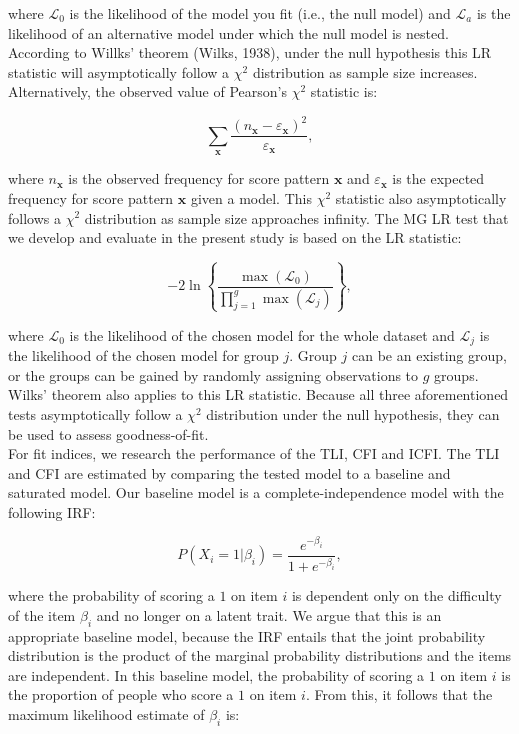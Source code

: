 \documentclass[Royal,sageapa,times,doublespace]{sagej}
\begin{document}
where $\mathcal{L}_0$ is the likelihood of the model you fit (i.e., the null model) and $\mathcal{L}_a$ is the likelihood of an alternative model under which the null model is nested. According to Willks' theorem (Wilks, 1938), under the null hypothesis this LR statistic will asymptotically follow a $\chi^2$ distribution as sample size increases. Alternatively, the observed value of Pearson's $\chi^2$ statistic is:

\begin{equation}
\sum_{\boldsymbol{x}} \frac{(n_{\boldsymbol{x}} - \varepsilon_{\boldsymbol{x}})^2}{\varepsilon_{\boldsymbol{x}}},
\end{equation}

where $n_{\boldsymbol{x}}$ is the observed frequency for score pattern $\boldsymbol{x}$ and $\varepsilon_{\boldsymbol{x}}$ is the expected frequency for score pattern $\boldsymbol{x}$ given a model. This $\chi^2$ statistic also asymptotically follows a $\chi^2$ distribution as sample size approaches infinity. The MG LR test that we develop and evaluate in the present study is based on the LR statistic: 

\begin{equation}
-2 \ln \left \{ \frac{\max(\mathcal{L}_0)}{\prod_{j = 1}^g \max(\mathcal{L}_j)} \right \},
\end{equation}
 
where $\mathcal{L}_0$ is the likelihood of the chosen model for the whole dataset and $\mathcal{L}_j$ is the likelihood of the chosen model for group $j$. Group $j$ can be an existing group, or the groups can be gained by randomly assigning observations to $g$ groups. Wilks' theorem also applies to this LR statistic. Because all three aforementioned tests asymptotically follow a $\chi^2$ distribution under the null hypothesis, they can be used to assess goodness-of-fit. \\
\indent For fit indices, we research the performance of the TLI, CFI and ICFI. The TLI and CFI are estimated by comparing the tested model to a baseline and saturated model. Our baseline model is a complete-independence model with the following IRF:

\begin{equation}
P(X_i = 1 | \beta_{i}) = \frac{e^{- \beta_{i}}}{1 + e^{- \beta_{i}}},
\end{equation}

where the probability of scoring a $1$ on item $i$ is dependent only on the difficulty of the item $\beta_i$ and no longer on a latent trait. We argue that this is an appropriate baseline model, because the IRF entails that the joint probability distribution is the product of the marginal probability distributions and the items are independent. In this baseline model, the probability of scoring a $1$ on item $i$ is the proportion of people who score a $1$ on item $i$. From this, it follows that the maximum likelihood estimate of $\beta_{i}$ is:
\end{document}

